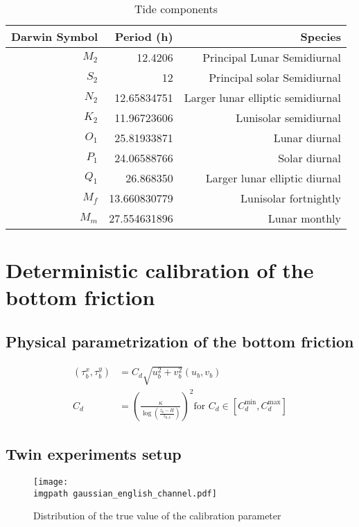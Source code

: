 \documentclass[../../Main_ManuscritThese.tex]{subfiles}
\newcommand\imgpath{/home/victor/acadwriting/Manuscrit/Text/Chapter5/img/}
\begin{document}
\begin{table}[!h]
  \centering %
  \begin{tabular}{rrr}\toprule
    Darwin Symbol & Period (h)& Species \\ \midrule
    $M_2$& 12.4206 & Principal Lunar Semidiurnal \\
    $S_2$& 12 & Principal solar Semidiurnal \\
    $N_2$& 12.65834751& Larger lunar elliptic semidiurnal  \\
    $K_2$& 11.96723606  & Lunisolar semidiurnal \\
    $O_1$& 25.81933871 & Lunar diurnal \\
    $P_1$& 24.06588766 & Solar diurnal\\
    $Q_1$& 26.868350 & Larger lunar elliptic diurnal \\
    $M_f$& 13.660830779 & Lunisolar fortnightly  \\
    $M_m$& 27.554631896 &Lunar monthly  \\
    \bottomrule
  \end{tabular}
  \caption{Tide components}
  \label{tab:tides_components}
\end{table}

\section{Deterministic calibration of the bottom friction}

\subsection{Physical parametrization of the bottom friction}
\begin{align}
  \label{eq:quadratic_friction_vonkarman}
  (\tau_b^x, \tau_b^y) &= C_d \sqrt{u_b^2 + v_b^2}(u_b, v_b) \\  
  C_d &= \left(\frac{\kappa}{\log\left(\frac{z_b - H}{z_{0,b}}\right)}\right)^2 \text{for } C_d \in [C_d^{\min}, C_d^{\max}]
\end{align}



\subsection{Twin experiments setup}
\begin{figure}[ht]
  \centering
  \texttt{[image: \\imgpath gaussian\_english\_channel.pdf]}
  \caption{\label{fig:gaussian_zob} Distribution of the true value of the calibration parameter}
\end{figure}
\end{document}
